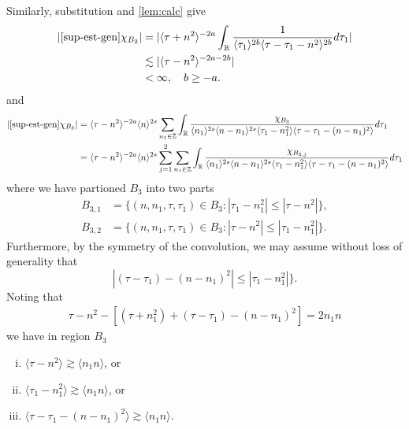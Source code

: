 \documentclass[12pt,reqno]{amsart}
\numberwithin{equation}{section}  %
\numberwithin{figure}{section}
\newcommand{\rr}{\mathbb{R}}
\newcommand{\zz}{\mathbb{Z}}
\theoremstyle{plain}
\theoremstyle{definition}
\theoremstyle{remark}
\begin{document}
Similarly, substitution and \autoref{lem:calc} give
%
%
\begin{equation}
\begin{split}
  |  \eqref{sup-est-gen} \chi_{B_{2}}|
  & = | \langle \tau +n^{2} \rangle ^{-2a}\int_{\rr} \frac{1}{\langle \tau_{1}\rangle ^{2b}\langle
  \tau - \tau_{1} - n^{2} \rangle ^{2b}}d \tau_{1} |
  \\
  & \lesssim |  \langle \tau - n^{2} \rangle ^{-2a-2b} |
  \\
  & < \infty, \quad b \ge -a.
\end{split}
\end{equation}
and
%
%
\begin{equation*}
\begin{split}
  | \eqref{sup-est-gen} \chi_{B_{3}} |
  & = 
  \langle \tau - n^{2}  \rangle ^{-2a} \langle n
    \rangle ^{2s}
    \sum_{n_{1} \in \zz} \int_{\rr} \frac{\chi_{B_{3}}}{ \langle n_{1} \rangle ^{2s} \langle n-n_{1} \rangle ^{2s} 
\langle \tau_{1} - n_{1}^{2}  \rangle \langle  \tau - \tau_{1} - (n -
n_{1})^{2}  \rangle}
d \tau_1 
\\
& = \langle \tau - n^{2}  \rangle ^{-2a} \langle n
    \rangle ^{2s}
    \sum_{j=1}^{2} \sum_{n_{1} \in \zz} \int_{\rr} \frac{\chi_{B_{3,j}}}{ \langle n_{1} \rangle ^{2s} \langle n-n_{1} \rangle ^{2s} 
\langle \tau_{1} - n_{1}^{2}  \rangle \langle  \tau - \tau_{1} - (n -
n_{1})^{2}  \rangle}
d \tau_1 
\end{split}
\end{equation*}
%
%
where we have partioned $ B_{3}$ into two parts
\begin{align*}
B_{3,1}&=\{(n, n_1, \tau, \tau_1)\in B_3: |\tau_1-n_1^2|\leq|\tau-n^2|\},\\
B_{3,2}&=\{(n, n_1, \tau, \tau_1)\in B_3: |\tau-n^2|\leq|\tau_1-n_1^2| \}.
\end{align*} 
Furthermore, by the symmetry of the convolution, we may assume without loss of
generality that
$$|(\tau-\tau_1)-(n-n_1)^2|\leq|\tau_1-n_1^2|\}.$$
Noting that 
%
%
\begin{equation*}
\begin{split}
  \tau - n^{2} - \left[ (\tau + n_{1}^{2}) + (\tau - \tau_{1}) - (n -
  n_{1})^{2} \right] = 2n_{1}n
\end{split}
\end{equation*}
%
%
we have in region $B_{3}$ 
%
%
\begin{enumerate}[(i)]
  \item{$\langle \tau - n^{2} \rangle  \gtrsim \langle n_{1}n \rangle$, or}
    \\
  \item{  $\langle \tau_{1} - n_{1}^{2} \rangle  \gtrsim \langle n_{1}n \rangle$, or}
    \\
  \item{ $\langle \tau - \tau_{1} - (n - n_{1})^{2} \rangle  \gtrsim \langle n_{1}n
    \rangle$}.
\end{enumerate}
\end{document}
